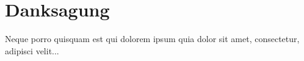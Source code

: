 \chapter*{Danksagung}

Neque porro quisquam est qui dolorem ipsum quia dolor sit amet, consectetur, adipisci velit...